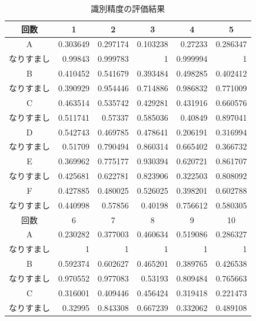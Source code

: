 \begin{table}[btph]
  \centering
  \caption{識別精度の評価結果}
  \label{auth-result}
  \begin{tabular}{|c|r|r|r|r|r|} \hline
    \multicolumn{1}{|c|}{回数} & \multicolumn{1}{c|}{1} & \multicolumn{1}{c|}{2} & \multicolumn{1}{c|}{3} & \multicolumn{1}{c|}{4} & \multicolumn{1}{c|}{5} \\ \hline
    A & 0.303649 & 0.297174 & 0.103238 & 0.27233 & 0.286347 \\
    なりすまし & 0.99843 & 0.999783 & 1 & 0.999994 & 1 \\ \hline
    B & 0.410452 & 0.541679 & 0.393484 & 0.498285 & 0.402412 \\
    なりすまし & 0.390929 & 0.954446 & 0.714886 & 0.986832 & 0.771009 \\ \hline
    C & 0.463514 & 0.535742 & 0.429281 & 0.431916 & 0.660576 \\ %
    なりすまし & 0.511741 & 0.57337 & 0.585036 & 0.40849 & 0.897041 \\ \hline
    D & 0.542743 & 0.469785 & 0.478641 & 0.206191 & 0.316994 \\
    なりすまし & 0.51709 & 0.790494 & 0.860314 & 0.665402 & 0.366732 \\ \hline
    E & 0.369962 & 0.775177 & 0.930394 & 0.620721 & 0.861707 \\
    なりすまし & 0.425681 & 0.622781 & 0.823906 & 0.322503 & 0.808092 \\ \hline
    F & 0.427885 & 0.480025 & 0.526025 & 0.398201 & 0.602788 \\
    なりすまし & 0.440998 & 0.57856 & 0.40198 & 0.756612 & 0.580305 \\ \hline \hline
    \multicolumn{1}{|c|}{回数} & \multicolumn{1}{c|}{6} & \multicolumn{1}{c|}{7} & \multicolumn{1}{c|}{8} & \multicolumn{1}{c|}{9} & \multicolumn{1}{c|}{10} \\ \hline
    A & 0.230282 & 0.377003 & 0.460634 & 0.519086 & 0.286327 \\
    なりすまし & 1 & 1 & 1 & 1 & 1 \\ \hline
    B & 0.592374 & 0.602627 & 0.465201 & 0.389765 & 0.426538 \\
    なりすまし & 0.970552 & 0.977083 & 0.53193 & 0.809484 & 0.765663 \\ \hline
    C & 0.316001 & 0.409446 & 0.456424 & 0.319418 & 0.221473 \\
    なりすまし & 0.32995 & 0.843308 & 0.667239 & 0.332062 & 0.489108 \\ \hline

\end{tabular}
\end{table}
